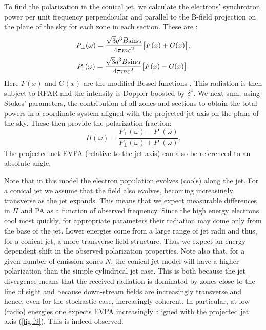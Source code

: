 	To find the polarization in the conical jet, we calculate the electrons' synchrotron power per unit frequency perpendicular and parallel to the B-field projection on the plane of the sky for each zone in each section. These are \citep{rybicki_radiative_1979}:
\begin{equation}
P_{\perp}(\omega) = \frac{\sqrt{3}q^3B{\rm sin}\alpha}{4\pi mc^2}\big[F(x) + G(x)\big],
\end{equation}
\begin{equation}
P_{\parallel}(\omega) = \frac{\sqrt{3}q^3B{\rm sin}\alpha}{4\pi mc^2}\big[F(x) - G(x)\big].
\end{equation}
Here $F(x)$ and $G(x)$ are the modified Bessel functions \citep[e.g.][]{longair_high_2011}. This radiation is then subject to RPAR and the intensity is Doppler boosted by $\delta^4$. We next sum, using Stokes' parameters, the contribution of all zones and sections to obtain the total powers in a coordinate system aligned with the projected jet axis on the plane of the sky. These then provide the polarization fraction:
\begin{equation}
\Pi(\omega) = \frac{P_{\perp}(\omega) - P_{\parallel}(\omega)}{P_{\perp}(\omega) + P_{\parallel}(\omega)}.
\end{equation}
The projected net EVPA (relative to the jet axis) can also be referenced to an absolute angle.

Note that in this model the electron population evolves (cools) along the jet. For a conical jet we assume that the field also evolves, becoming increasingly transverse as the jet expands. This means that we expect measurable differences in $\Pi$ and PA as a function of observed frequency. Since the high energy electrons cool most quickly, for appropriate parameters their radiation may come only from the base of the jet. Lower energies come from a large range of jet radii and thus, for a conical jet, a more transverse field structure. Thus we expect an energy-dependent shift in the observed polarization properties. Note also that, for  a given number of emission zones $N$, the conical jet model will have a higher polarization than the simple cylindrical jet case. This is both because the jet divergence means that the received radiation is dominated by zones close to the line of sight and because down-stream fields are increasingly transverse and hence, even for the stochastic case, increasingly coherent. In particular, at low (radio) energies one expects EVPA increasingly aligned with the projected jet axis (\cref{fig:f9}). This is indeed observed.
 

